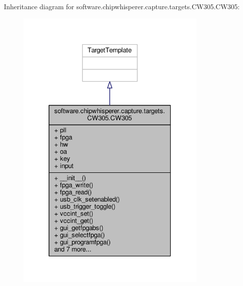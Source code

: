 Inheritance diagram for software.\+chipwhisperer.\+capture.\+targets.\+C\+W305.\+C\+W305\+:\nopagebreak
\begin{figure}[H]
\begin{center}
\leavevmode
\includegraphics[width=268pt]{d6/d98/classsoftware_1_1chipwhisperer_1_1capture_1_1targets_1_1CW305_1_1CW305__inherit__graph}
\end{center}
\end{figure}


